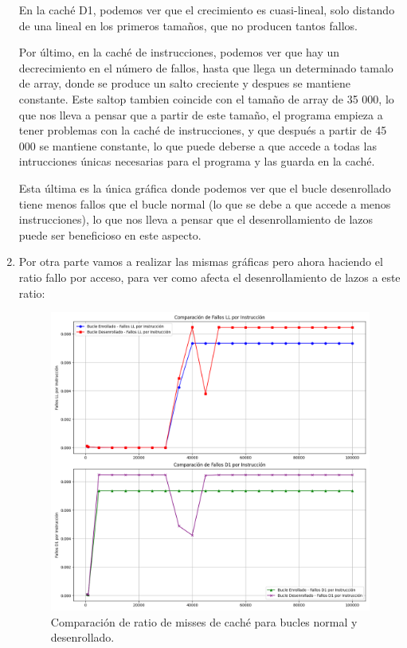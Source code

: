 \documentclass[a4paper,twocolumn]{article}
\begin{document}
\begin{enumerate}
    En la caché D1, podemos ver que el crecimiento es cuasi-lineal, solo distando de una lineal en los primeros tamaños, que no producen tantos fallos. 

    Por último, en la caché de instrucciones, podemos ver que hay un decrecimiento en el número de fallos, hasta que llega un determinado tamalo de array, donde se produce un salto creciente y despues se mantiene constante. Este saltop tambien coincide con el tamaño de array de 35 000, lo que nos lleva a pensar que a partir de este tamaño, el programa empieza a tener problemas con la caché de instrucciones, y que después a partir de 45 000 se mantiene constante, lo que puede deberse a que accede a todas las intrucciones únicas necesarias para el programa y las guarda en la caché.

    Esta última es la única gráfica donde podemos ver que el bucle desenrollado tiene menos fallos que el bucle normal (lo que se debe a que accede a menos instrucciones), lo que nos lleva a pensar que el desenrollamiento de lazos puede ser beneficioso en este aspecto.

    \item Por otra parte vamos a realizar las mismas gráficas pero ahora haciendo el ratio fallo por acceso, para ver como afecta el desenrollamiento de lazos a este ratio:

    \begin{figure}[H]
        \centering
        \includegraphics[width=\columnwidth]{img/cacheRatioAux.png}
        \caption{Comparación de ratio de misses de caché para bucles normal y desenrollado.}
        \label{fig:real_vs_cpu_time}
    \end{figure}


\end{enumerate}
\end{document}
